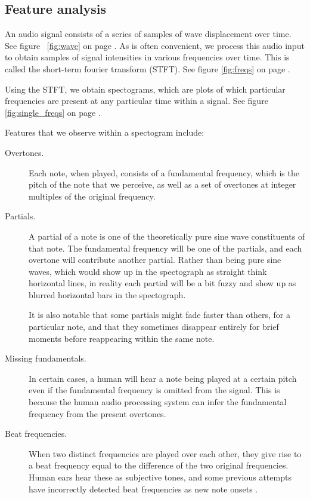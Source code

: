 \documentclass{article}
\begin{document}
\subsection{Feature analysis}
An audio signal consists of a series of samples of wave displacement over time. See figure ~\ref{fig:wave} on page \pageref{fig:wave}.
As is often convenient, we process this audio input to obtain samples of
signal intensities in various frequencies over time.  This is called the
short-term fourier transform (STFT). See figure \ref{fig:freqs} on page \pageref{fig:freqs}.


Using the STFT, we obtain spectograms, which are plots of which
particular frequencies are present at any particular time within a signal. See figure \ref{fig:single_freqs} on page \pageref{fig:single_freqs}.

Features that we observe within a spectogram include:
\begin{description}
\item[Overtones.]
  Each note, when played, consists of a fundamental frequency, which is the
  pitch of the note that we perceive, as well as a set of overtones at
  integer multiples of the original frequency.
\item[Partials.]
  A partial of a note is one of the theoretically pure sine wave constituents of
  that note. The fundamental frequency will be one of the partials, and each
  overtone will contribute another partial. Rather than being pure sine waves,
  which would show up in the spectograph as straight think horizontal lines, in
  reality each partial will be a bit fuzzy and show up as blurred horizontal
  bars in the spectograph.

  It is also notable that some partials might fade faster than others, for a
  particular note, and that they sometimes disappear entirely for brief moments
  before reappearing within the same note.
\item[Missing fundamentals.] 
  In certain cases, a human will hear a note being played at a certain pitch
  even if the fundamental frequency is omitted from the signal. This is because
  the human audio processing system can infer the fundamental frequency from
  the present overtones. 
\item[Beat frequencies.]
  When two distinct frequencies are played over each other, they give rise to
  a beat frequency equal to the difference of the two original frequencies.
  Human ears hear these as subjective tones, and some previous attempts have
  incorrectly detected beat frequencies as new note onsets
  \cite{marolt2004connectionist}. 
\end{description}
\end{document}
